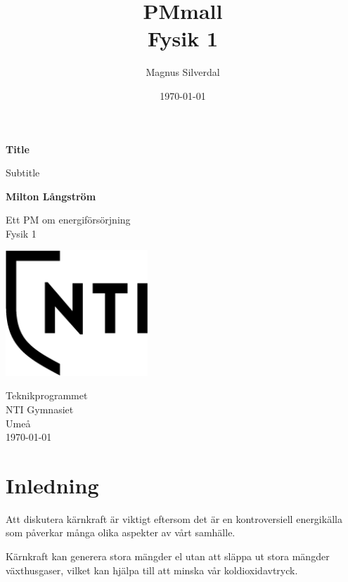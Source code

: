 \documentclass[11p]{article}
\title{PMmall \\ \small Fysik 1}
\author{Magnus Silverdal }
\date{\today}
\begin{document}
    \begin{titlepage}
        \begin{center}
            \vspace*{1cm}

            \Huge
            \textbf{Title}

            \vspace{0.5cm}
            \LARGE
            Subtitle

            \vspace{1.5cm}

            \textbf{Milton Långström}

            \vfill

            Ett PM om energiförsörjning \\
            Fysik 1

            \vspace{0.8cm}

            \includegraphics[width=0.4\textwidth]{NTI Gymnasiet_Symbol_print_svart}

            \Large
            Teknikprogrammet\\
            NTI Gymnasiet\\
            Umeå\\
            \today

        \end{center}
    \end{titlepage}
    \tableofcontents
    \newpage

    \section{Inledning}
    Att diskutera kärnkraft är viktigt eftersom det är en kontroversiell energikälla som påverkar många olika aspekter av vårt samhälle.

    Kärnkraft kan generera stora mängder el utan att släppa ut stora mängder växthusgaser, vilket kan hjälpa till att minska vår koldioxidavtryck.
\end{document}
